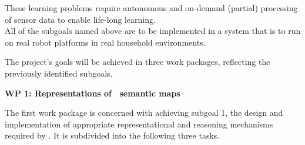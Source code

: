   These learning problems require autonomous and on-demand (partial) 
  processing of sensor data to enable life-long learning.\\

All of the subgoals named above are to be implemented in a system that
is to run on real robot platforms in real household environments.

The project's goals will be achieved in three work packages, reflecting
the previously identified subgoals.

\textbf{WP 1: Representations of \ksem\ semantic maps}

The first work package is concerned with achieving subgoal 1, the design
and implementation of appropriate representational and reasoning
mechanisms required by \ksem. It is subdivided into the following
three tasks.

